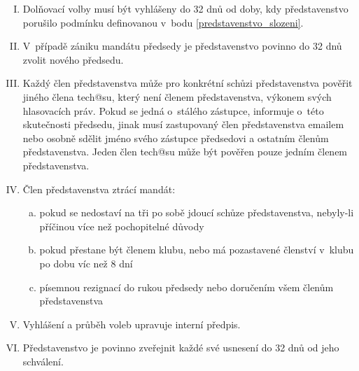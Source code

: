 \documentclass[10pt]{article}
\begin{document}
\begin{enumerate}[I.]
	\item Dolňovací volby musí být vyhlášeny do 32 dnů od doby, kdy představenstvo porušilo podmínku definovanou v~bodu \ref{predstavenstvo_slozeni}.
	\item V~případě zániku mandátu předsedy je představenstvo povinno do 32 dnů zvolit nového předsedu.
	\item \label{povereni} Každý člen představenstva může pro konkrétní schůzi představenstva pověřit jiného člena tech@su, který není členem představenstva, výkonem svých hlasovacích práv. Pokud se jedná o~stálého zástupce, informuje o~této skutečnosti předsedu, jinak musí zastupovaný člen představenstva emailem nebo osobně sdělit jméno svého zástupce předsedovi a ostatním členům představenstva. Jeden člen tech@su může být pověřen pouze jedním členem představenstva.  
	\item Člen představenstva ztrácí mandát:
		\begin{enumerate}[a.]
		\item pokud se nedostaví na tři po sobě jdoucí schůze představenstva, nebyly-li příčinou více než pochopitelné důvody
		\item pokud přestane být členem klubu, nebo má pozastavené členství v~klubu po dobu víc než 8 dní
		\item písemnou rezignací do rukou předsedy nebo doručením všem členům představenstva
		\end{enumerate}
	\item Vyhlášení a průběh voleb upravuje interní předpis. 
	\item Představenstvo je povinno zveřejnit každé své usnesení do 32 dnů od jeho schválení.
	\end{enumerate}
\end{document}
